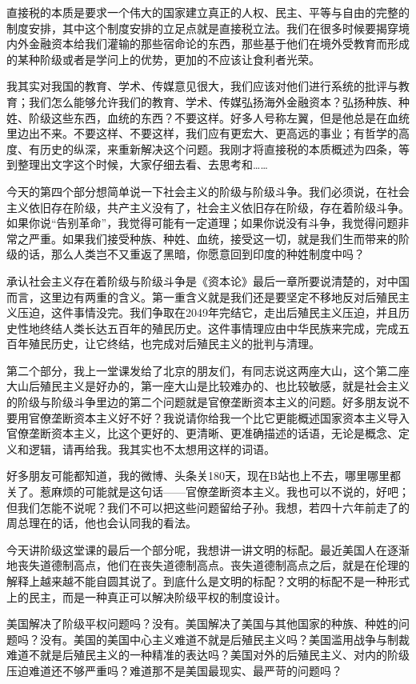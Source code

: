 \documentclass[UTF8, 12pt, a4paper]{ctexrep}
\begin{document}
直接税的本质是要求一个伟大的国家建立真正的人权、民主、平等与自由的完整的制度安排，其中这个制度安排的立足点就是直接税立法。我们在很多时候要揭穿境内外金融资本给我们灌输的那些宿命论的东西，那些基于他们在境外受教育而形成的某种阶级或者是学问上的优势，更加的不应该让食利者光荣。

我其实对我国的教育、学术、传媒意见很大，我们应该对他们进行系统的批评与教育；我们怎么能够允许我们的教育、学术、传媒弘扬海外金融资本？弘扬种族、种姓、阶级这些东西，血统的东西？不要这样。好多人号称左翼，但是他总是在血统里边出不来。不要这样、不要这样，我们应有更宏大、更高远的事业；有哲学的高度、有历史的纵深，来重新解决这个问题。我刚才将直接税的本质概述为四条，等到整理出文字这个时候，大家仔细去看、去思考和……

今天的第四个部分想简单说一下社会主义的阶级与阶级斗争。我们必须说，在社会主义依旧存在阶级，共产主义没有了，社会主义依旧存在阶级，存在着阶级斗争。如果你说“告别革命”，我觉得可能有一定道理；如果你说没有斗争，我觉得问题非常之严重。如果我们接受种族、种姓、血统，接受这一切，就是我们生而带来的阶级的话，那么人类岂不又重返了黑暗，你愿意回到印度的种姓制度中吗？

承认社会主义存在着阶级与阶级斗争是《资本论》最后一章所要说清楚的，对中国而言，这里边有两重的含义。第一重含义就是我们还是要坚定不移地反对后殖民主义压迫，这件事情没完。我们争取在2049年完结它，走出后殖民主义压迫，并且历史性地终结人类长达五百年的殖民历史。这件事情理应由中华民族来完成，完成五百年殖民历史，让它终结，也完成对后殖民主义的批判与清理。

第二个部分，我上一堂课发给了北京的朋友们，有同志说这两座大山，这个第二座大山后殖民主义是好办的，第一座大山是比较难办的、也比较敏感，就是社会主义的阶级与阶级斗争里边的第二个问题就是官僚垄断资本主义的问题。好多朋友说不要用官僚垄断资本主义好不好？我说请你给我一个比它更能概述国家资本主义导入官僚垄断资本主义，比这个更好的、更清晰、更准确描述的话语，无论是概念、定义和逻辑，请再给我。我其实也不太想用这样的词语。

好多朋友可能都知道，我的微博、头条关180天，现在B站也上不去，哪里哪里都关了。惹麻烦的可能就是这句话——官僚垄断资本主义。我也可以不说的，好吧；但我们怎能不说呢？我们不可以把这些问题留给子孙。我想，若四十六年前走了的周总理在的话，他也会认同我的看法。

今天讲阶级这堂课的最后一个部分呢，我想讲一讲文明的标配。最近美国人在逐渐地丧失道德制高点，他们在丧失道德制高点。丧失道德制高点之后，就是在伦理的解释上越来越不能自圆其说了。到底什么是文明的标配？文明的标配不是一种形式上的民主，而是一种真正可以解决阶级平权的制度设计。

美国解决了阶级平权问题吗？没有。美国解决了美国与其他国家的种族、种姓的问题吗？没有。美国的美国中心主义难道不就是后殖民主义吗？美国滥用战争与制裁难道不就是后殖民主义的一种精准的表达吗？美国对外的后殖民主义、对内的阶级压迫难道还不够严重吗？难道那不是美国最现实、最严苛的问题吗？
\end{document}
